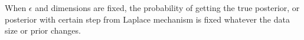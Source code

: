 \documentclass{article}
\begin{document}

When $\epsilon$ and dimensions are fixed, the probability of getting the true posterior, or posterior with certain step from Laplace mechanism is fixed whatever the data size or prior changes.
\end{document}
